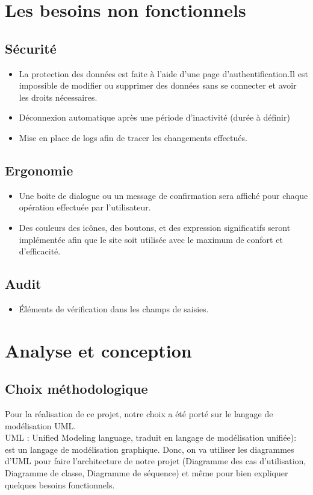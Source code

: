\documentclass{article}
\begin{document}
\section{Les besoins non fonctionnels}
\subsection{Sécurité}
\begin{itemize}
 \item La protection des données est faite à l'aide d'une page d'authentification.Il est impossible de modifier ou supprimer des données sans se connecter et avoir les droits nécessaires. 
 \item Déconnexion automatique après une période d'inactivité (durée à définir)
 \item Mise en place de logs afin de tracer les changements effectués.
\end{itemize}
\subsection{Ergonomie}
\begin{itemize}
\item Une boite de dialogue ou un message de confirmation sera affiché pour chaque opération effectuée par l'utilisateur.
\item Des couleurs des icônes, des boutons, et des expression significatifs seront implémentée afin que le site soit utilisée avec le maximum de confort et d'efficacité.
\end{itemize}
\subsection{Audit}
\begin{itemize}
\item Éléments de vérification dans les champs de saisies.
\end{itemize}

\section{Analyse et conception}

\subsection{Choix méthodologique}

Pour la réalisation de ce projet, notre choix a été porté sur le langage de modélisation UML.\\
UML : Unified Modeling language, traduit en langage de modélisation unifiée): est un langage de modélisation graphique.
Donc, on va utiliser les diagrammes d'UML pour faire l'architecture de notre projet (Diagramme des cas d'utilisation, Diagramme de classe, Diagramme de séquence) et même pour bien expliquer quelques besoins fonctionnels.\\  
\end{document}
